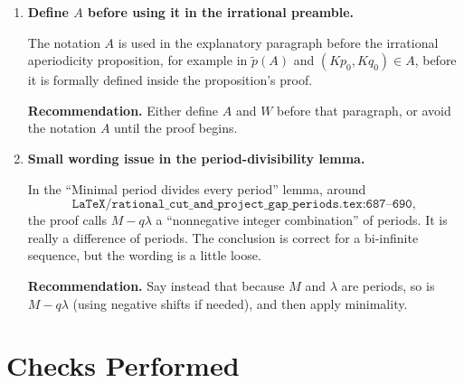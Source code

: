 \documentclass[11pt]{article}
\begin{document}
\begin{enumerate}[label=\textbf{F\arabic*.},leftmargin=*]
The Lean proof is cleaner: it only produces the forward inclusion
\[
A+v\subseteq A
\]
in
\[
\texttt{period\_lifts\_to\_lattice\_translation}
\quad(\texttt{Irrational.lean:704--709}),
\]
and
\[
\texttt{lattice\_translation\_must\_be\_zero}
\quad(\texttt{Irrational.lean:798--801})
\]
proves that this forward inclusion alone
forces \(v=0\).

\textbf{Recommendation.}  Align the paper proof with Lean: claim only
\(A+v\subseteq A\), and in Step~3 derive the contradiction from this forward
inclusion by choosing an internal point near the appropriate endpoint of the
window.

\item \textbf{Define \(A\) before using it in the irrational preamble.}

The notation \(A\) is used in the explanatory paragraph before
the irrational aperiodicity proposition, for example in \(\tilde p(A)\) and
\((Kp_0,Kq_0)\in A\), before it is formally defined inside the proposition's
proof.

\textbf{Recommendation.}  Either define \(A\) and \(W\) before that paragraph,
or avoid the notation \(A\) until the proof begins.

\item \textbf{Small wording issue in the period-divisibility lemma.}

In the ``Minimal period divides every period'' lemma, around
\[
\texttt{LaTeX/rational\_cut\_and\_project\_gap\_periods.tex:687--690},
\]
the proof calls \(M-q\lambda\) a ``nonnegative integer combination'' of
periods.  It is really a difference of periods.  The conclusion is correct
for a bi-infinite sequence, but the wording is a little loose.

\textbf{Recommendation.}  Say instead that because \(M\) and \(\lambda\) are
periods, so is \(M-q\lambda\) (using negative shifts if needed), and then
apply minimality.

\end{enumerate}

\section*{Checks Performed}
\end{document}
